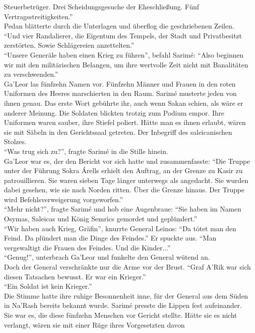 Steuerbetrüger. Drei Scheidungsgesuche der Eheschließung. Fünf Vertragsstreitigkeiten.''\\
Pedan blätterte durch die Unterlagen und überflog die geschriebenen Zeilen. ``Und vier Randalierer, 
die Eigentum des Tempels, der Stadt und Privatbesitzt zerstörten. Sowie Schlägereien 
anzettelten.''\\
``Unsere Generäle haben einen Krieg zu führen'', befahl Sarimé: ``Also beginnen wir mit den 
militärischen Belangen, um ihre wertvolle Zeit nicht mit Banalitäten zu verschwenden.''\\
Ga'Leor las fünfzehn Namen vor. Fünfzehn Männer und Frauen in den roten Uniformen des Heeres 
marschierten in den Raum. Sarimé musterte jeden von ihnen genau. Das erste Wort gebührte ihr, auch 
wenn Sakan schien, als wäre er anderer Meinung. Die Soldaten blickten trotzig zum Podium empor. 
Ihre Uniformen waren sauber, ihre Stiefel poliert. Hätte man es ihnen erlaubt, wären sie mit 
Säbeln in den Gerichtssaal getreten. Der Inbegriff des saleicanischen Stolzes.\\
``Was trug sich zu?'', fragte Sarimé in die Stille hinein.\\
Ga'Leor war es, der den Bericht vor sich hatte und zusammenfasste: ``Die Truppe unter der Führung 
Sokra Árells erhielt den Auftrag, an der Grenze zu Kasir zu patrouillieren. Sie waren sieben Tage 
länger unterwegs als angedacht. Sie wurden dabei gesehen, wie sie nach Norden ritten. Über die 
Grenze hinaus. Der Truppe wird Befehlsverweigerung vorgeworfen.''\\
``Mehr nicht?'', fragte Sarimé und hob eine Augenbraue: ``Sie haben im Namen Osymas, Saleicas und 
König Semrics gemordet und geplündert.''\\
``Wir haben auch Krieg, Gräfin'', knurrte General Leinos: ``Da tötet man den Feind. Da plündert man 
die Dinge des Feindes.'' Er spuckte aus. ``Man vergewaltigt die Frauen des Feindes. Und die 
Kinder...''\\
``Genug!'', unterbrach Ga'Leor und funkelte den General wütend an.\\
Doch der General verschränkte nur die Arme vor der Brust. ``Graf A'Rik war sich diesen Tatsachen 
bewusst. Er war ein Krieger.''\\
``Ein Soldat ist kein Krieger.''\\
Die Stimme hatte ihre ruhige Besonnenheit inne, für der General aus dem Süden in Na'Rash bereits 
bekannt wurde. Sarimé presste die Lippen fest aufeinander. Sie war es, die diese fünfzehn Menschen 
vor Gericht stellte. Hätte sie es nicht verlangt, wären sie mit einer Rüge ihres Vorgesetzten davon 
